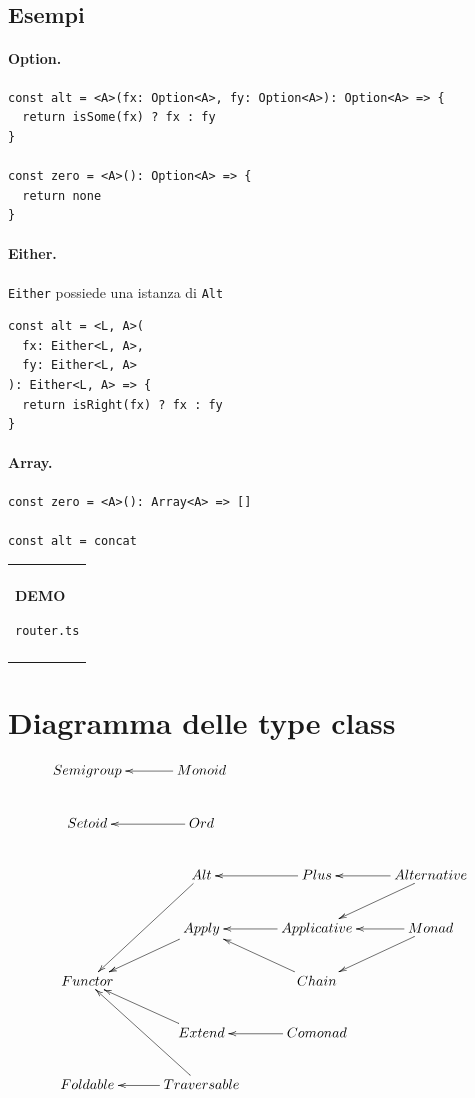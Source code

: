 \documentclass[12pt]{article}
\newenvironment{demo}
    {\begin{center}
    \begin{tabular}{|p{0.9\textwidth}|}
    \hline\\
    }
    {
    \\\\\hline
    \end{tabular}
    \end{center}
    }
\begin{document}
\subsection{Esempi}

\paragraph{Option.}

\begin{verbatim}
const alt = <A>(fx: Option<A>, fy: Option<A>): Option<A> => {
  return isSome(fx) ? fx : fy
}

const zero = <A>(): Option<A> => {
  return none
}
\end{verbatim}

\paragraph{Either.} \texttt{Either} possiede una istanza di \texttt{Alt}

\begin{verbatim}
const alt = <L, A>(
  fx: Either<L, A>,
  fy: Either<L, A>
): Either<L, A> => {
  return isRight(fx) ? fx : fy
}
\end{verbatim}

\paragraph{Array.}

\begin{verbatim}
const zero = <A>(): Array<A> => []

const alt = concat
\end{verbatim}

\begin{demo}
\begin{center}
\textbf{DEMO}

\texttt{router.ts}
\end{center}
\end{demo}

\newpage

\section{Diagramma delle type class}

\[
\xymatrix{
  Semigroup & Monoid \ar[l] \\
  Setoid & Ord \ar[l] \\
  & Alt \ar[ldd] & Plus \ar[l] & Alternative \ar[l] \ar[ld] \\
  & Apply \ar[ld] & Applicative \ar[l] & Monad \ar[l] \ar[ld] \\
  Functor & & Chain \ar[lu] \\
  & Extend \ar[lu] & Comonad \ar[l] \\
  Foldable & Traversable \ar[l] \ar[uul] \\
}
\]
\end{document}
